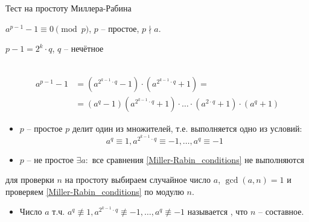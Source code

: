 \documentclass{beamer}
\begin{document}
\begin{frame}{Тест на простоту Миллера-Рабина}%
\begin{center}
    \begin{tcolorbox}[enhanced,hbox,colback=title-and-section-color!5,colframe=title-and-section-color!120,title=Малая теорема Ферма,center title]
        \begin{varwidth}{\textwidth}
            \begin{center}
               $a^{p-1} - 1 \equiv 0 \pmod{p}$, $p$ -- простое, $p \nmid a$. 
            \end{center}
        \end{varwidth}
    \end{tcolorbox}	
\end{center}
\begin{center}
$p-1 = 2^k \cdot q$, $q$ -- нечётное\\
\structure{$\Downarrow$}\\
\end{center}
\begin{equation*}
\begin{split}
    a^{p-1} - 1 &= (a^{2^{k-1} \cdot q} - 1) \cdot (a^{2^{k-1} \cdot q} + 1) =\\&= (a^q - 1) (a^{2^{k-1} \cdot q} + 1) \cdot \ldots \cdot (a^{2 \cdot q} + 1) \cdot (a^q + 1)
\end{split}
\end{equation*}
\begin{itemize}
    \item $p$ -- простое \structure{$\implies$} $p$ делит один из множителей, т.е. выполняется одно из условий:
    \begin{equation}
        \label{Miller-Rabin_conditions}
        a^q \equiv 1, a^{2^{k-1} \cdot q} \equiv -1, \ldots, a^{q} \equiv -1
    \end{equation}
    \item $p$ -- не простое \structure{$\implies$} $\exists a:$ все сравнения \eqref{Miller-Rabin_conditions} не выполняются
\end{itemize}
\end{frame}

\begin{frame}
     для проверки $n$ на простоту выбираем случайное число $a$, $\gcd(a,n)=1$ и проверяем \eqref{Miller-Rabin_conditions} по модулю $n$.
    
    \begin{itemize}
        \item Число $a$ т.ч. $a^q \not\equiv 1, a^{2^{k-1} \cdot q} \not\equiv -1, \ldots, a^{q} \not\equiv -1$ называется , что $n$ -- составное.
    \end{itemize}
\end{frame}
\end{document}
